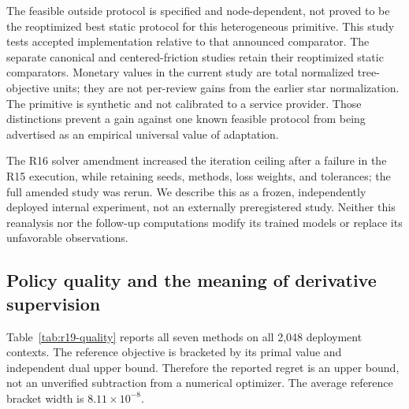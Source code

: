 \documentclass[11pt,letterpaper]{article}
\theoremstyle{definition}
\newcommand{\1}{\mathbf 1}
\begin{document}
The feasible outside protocol is specified and node-dependent, not proved to be the reoptimized best static protocol for this heterogeneous primitive. This study tests accepted implementation relative to that announced comparator. The separate canonical and centered-friction studies retain their reoptimized static comparators. Monetary values in the current study are total normalized tree-objective units; they are not per-review gains from the earlier star normalization. The primitive is synthetic and not calibrated to a service provider. Those distinctions prevent a gain against one known feasible protocol from being advertised as an empirical universal value of adaptation.

The R16 solver amendment increased the iteration ceiling after a failure in the R15 execution, while retaining seeds, methods, loss weights, and tolerances; the full amended study was rerun. We describe this as a frozen, independently deployed internal experiment, not an externally preregistered study. Neither this reanalysis nor the follow-up computations modify its trained models or replace its unfavorable observations.

\subsection{Policy quality and the meaning of derivative supervision}
Table~\ref{tab:r19-quality} reports all seven methods on all 2,048 deployment contexts. The reference objective is bracketed by its primal value and independent dual upper bound. Therefore the reported regret is an upper bound, not an unverified subtraction from a numerical optimizer. The average reference bracket width is $8.11\times10^{-8}$.
\end{document}

